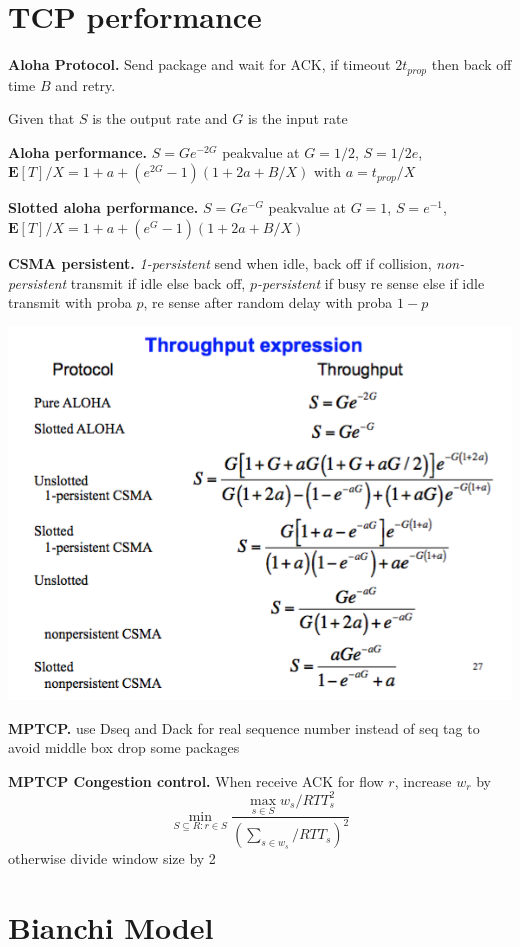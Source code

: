 \documentclass[10pt,twocolumn]{article}
\newcommand{\E}[1]{\mathbf{E}\l[#1\r]}
\renewcommand{\l}{\left}
\renewcommand{\r}{\right}
\renewcommand{\bf}{\textbf}
\begin{document}
\section{TCP performance}

\bf{Aloha Protocol.} Send package and wait for ACK, if timeout $2 t_{prop}$ then back off time $B$ and retry. 


Given that $S$ is the output rate and $G$ is the input rate

\bf{Aloha performance.} $S = Ge^{-2G}$ peakvalue at $G=1/2$, $S=1/2e$, $\E{T} / X = 1 + a + (e^{2G} - 1)(1 + 2a + B/X)$ with $a=t_{prop}/X$

\bf{Slotted aloha performance.} $S = Ge^{-G}$ peakvalue at $G=1$, $S=e^{-1}$, $\E{T} / X = 1 + a + (e^G - 1)(1 + 2a + B/X)$

\bf{CSMA persistent.} \emph{1-persistent} send when idle, back off if collision, \emph{non-persistent} transmit if idle else back off, \emph{$p$-persistent} if busy re sense else if idle transmit with proba $p$, re sense after random delay with proba $1-p$


\includegraphics[width=\linewidth]{figures/throughput.png}

\bf{MPTCP.} use Dseq and Dack for real sequence number instead of seq tag to avoid middle box drop some packages

\bf{MPTCP Congestion control.} When receive ACK for flow $r$, increase $w_r$ by 
\[
  \min_{S\subseteq R: r\in S} \frac{\max_{s\in S}w_s / RTT_s^2}{\l( \sum_{s\in w_s}/ RTT_s \r)^2}
\]
otherwise divide window size by 2

\section{Bianchi Model}
\end{document}
